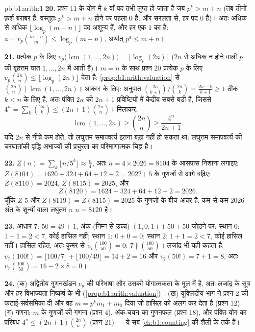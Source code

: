\begin{solution}{pb:b1:arith:1}
\textbf{20.} प्रश्न 11 के योग में $k$-वाँ पद तभी लुप्त हो जाता है जब $p^k >
m + n$ (तब तीनों फ़र्श बराबर हैं; वस्तुतः $p^k > m+n$ होने पर पहला $0$ है;
और सरलता से, हर पद $0$ है)। अतः अधिक से अधिक $\lfloor \log_p(m+n)\rfloor$ पद
अशून्य हैं, और हर एक $1$ का है: $a = v_p\binom{m+n}m \leq \log_p(m+n)$,
अर्थात् $p^a \leq m + n$।

\textbf{21.} प्रत्येक  $p$ के लिए $v_p\bigl(\operatorname{lcm}(1,
\dots, 2n)\bigr) = \lfloor\log_p(2n)\rfloor$ ($2n$ से अधिक न होने वाली $p$
की बृहत्तम घात $1, \dots, 2n$ में आती है)। $m = n$ के साथ प्रश्न 20 प्रत्येक
$p$ के लिए $v_p\binom{2n}n \leq \lfloor\log_p(2n)\rfloor$ देता है:
\cref{prop:b1:arith:valuation} से $\binom{2n}n \mid \operatorname{lcm}(1,
\dots, 2n)$। आकार के लिए: अनुपात $\binom{2n}{k+1}/\binom{2n}k =
\frac{2n-k}{k+1} \geq 1$ ठीक $k < n$ के लिए है, अतः पंक्ति $2n$ की $2n + 1$
प्रविष्टियों में केंद्रीय सबसे बड़ी है, जिससे $4^n = \sum_k \binom{2n}k \leq
(2n+1)\binom{2n}n$। मिलाकर:
\[
\operatorname{lcm}(1, \dots, 2n) \geq \binom{2n}n \geq
\frac{4^n}{2n + 1} .
\]
यदि $2n$ से नीचे  कम होते, तो लघुत्तम समापवर्त्य इतना बड़ा नहीं हो
सकता था: लघुत्तम समापवर्त्य की चरघातांकी वृद्धि अभाज्यों की प्रचुरता का
परिमाणात्मक चिह्न है।

\textbf{22.} $Z(n) = \sum_k\lfloor n/5^k\rfloor \approx \frac n4$, अतः $n =
4 \times 2026 = 8104$ के आसपास निशाना लगाइए: $Z(8104) = 1620 + 324 + 64 + 12
+ 2 = 2022$। $5$ के गुणजों से आगे बढ़िए: $Z(8110) = 2024$, $Z(8115) = 2025$,
और
\[
Z(8120) = 1624 + 324 + 64 + 12 + 2 = 2026 .
\]
चूँकि $Z$ $5$ और $Z(8119) = Z(8115) = 2025$ के गुणजों के बीच अचर है, कम से
कम $2026$ अंत के शून्यों वाला लघुतम $n$ $n = 8120$ है।

\textbf{23.} आधार $7$: $50 = 49 + 1$, अंक (निम्न से उच्च) $(1, 0, 1)$। $50 +
50$ जोड़ने पर: स्थान $0$: $1 + 1 = 2 < 7$, कोई हासिल नहीं; स्थान $1$: $0 + 0
= 0$; स्थान $2$: $1 + 1 = 2 < 7$, कोई हासिल नहीं। हासिल-रहित, अतः कुमर से
$v_7\binom{100}{50} = 0$: $7 \nmid \binom{100}{50}$। लजांद्र भी यही कहता है:
$v_7(100!) = \lfloor 100/7 \rfloor + \lfloor 100/49 \rfloor = 14 + 2 = 16$
और $v_7(50!) = 7 + 1 = 8$, अतः $v_7\binom{100}{50} = 16 - 2\times8 = 0$।

\textbf{24.} (क) अद्वितीय गुणनखंडन $v_p$ की परिभाषा और उसकी योगात्मकता के
मूल में है, अतः लजांद्र के सूत्र और हर विभाज्यता-निष्कर्ष के भी
(\cref{prop:b1:arith:valuation})। (ख) यूक्लिडीय भाग ने प्रश्न 2 की
कटाई-सर्वसमिका दी और वह  $m = p^km_1 + m_0$ दिया जो हासिल को अलग कर
देता है (प्रश्न 12)। (ग) गणना: $m$ के गुणजों की गणना (प्रश्न 4), अंक-चयन का
गुणनफल (प्रश्न 18), और पंक्ति-योग का परिबंध $4^n \leq (2n+1)\binom{2n}n$
(प्रश्न 21) --- ये सब \cref{ch:b1:counting} की शैली के तर्क हैं।


\end{solution}
